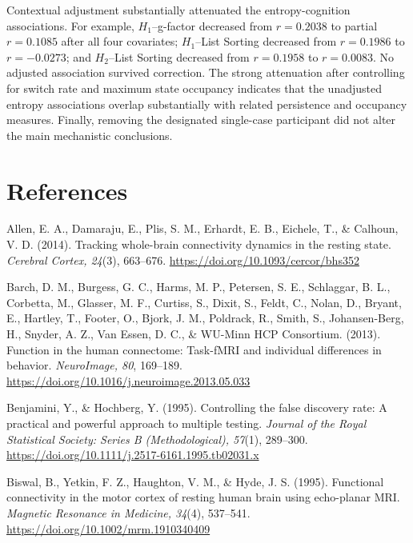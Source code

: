 \documentclass[12pt,a4paper]{report}
\begin{document}
Contextual adjustment substantially attenuated the entropy-cognition associations. For example, $H_1$--g-factor decreased from $r=0.2038$ to partial $r=0.1085$ after all four covariates; $H_1$--List Sorting decreased from $r=0.1986$ to $r=-0.0273$; and $H_2$--List Sorting decreased from $r=0.1958$ to $r=0.0083$. No adjusted association survived correction. The strong attenuation after controlling for switch rate and maximum state occupancy indicates that the unadjusted entropy associations overlap substantially with related persistence and occupancy measures. Finally, removing the designated single-case participant did not alter the main mechanistic conclusions.

\cleardoublepage
\chapter{References}

\begingroup
\small
\setlength{\parindent}{0pt}
\setlength{\parskip}{0.6em}
\sloppy

\newcommand{\bibentry}[1]{%
  \hangindent=0.5in
  #1\par
}

\bibentry{Allen, E. A., Damaraju, E., Plis, S. M., Erhardt, E. B., Eichele, T., \& Calhoun, V. D. (2014). Tracking whole-brain connectivity dynamics in the resting state. \textit{Cerebral Cortex, 24}(3), 663--676. \url{https://doi.org/10.1093/cercor/bhs352}}


\bibentry{Barch, D. M., Burgess, G. C., Harms, M. P., Petersen, S. E., Schlaggar, B. L., Corbetta, M., Glasser, M. F., Curtiss, S., Dixit, S., Feldt, C., Nolan, D., Bryant, E., Hartley, T., Footer, O., Bjork, J. M., Poldrack, R., Smith, S., Johansen-Berg, H., Snyder, A. Z., Van Essen, D. C., \& WU-Minn HCP Consortium. (2013). Function in the human connectome: Task-fMRI and individual differences in behavior. \textit{NeuroImage, 80}, 169--189. \url{https://doi.org/10.1016/j.neuroimage.2013.05.033}}

\bibentry{Benjamini, Y., \& Hochberg, Y. (1995). Controlling the false discovery rate: A practical and powerful approach to multiple testing. \textit{Journal of the Royal Statistical Society: Series B (Methodological), 57}(1), 289--300. \url{https://doi.org/10.1111/j.2517-6161.1995.tb02031.x}}

\bibentry{Biswal, B., Yetkin, F. Z., Haughton, V. M., \& Hyde, J. S. (1995). Functional connectivity in the motor cortex of resting human brain using echo-planar MRI. \textit{Magnetic Resonance in Medicine, 34}(4), 537--541. \url{https://doi.org/10.1002/mrm.1910340409}}
\end{document}

